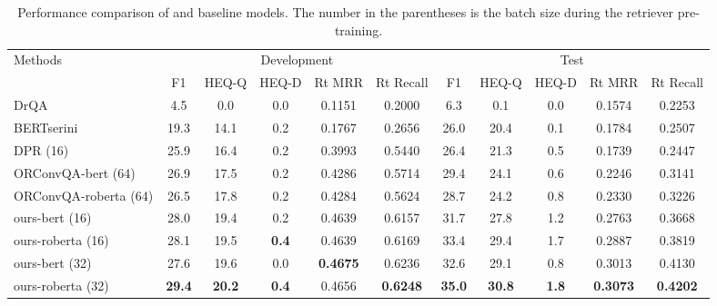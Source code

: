 \renewcommand{\arraystretch}{1.2}
\begin{table*}[t]
  \centering
  \caption{Performance comparison of {\modelname} and baseline models. The number in the parentheses is the batch size during the retriever pre-training.}
  \vspace{-0.1in}
     \begin{tabular}{p{10.5em}cccccccccc}
    \toprule
    \multirow{2}[4]{*}{Methods} & \multicolumn{5}{c}{Development}                       & \multicolumn{5}{c}{Test} \\
\cmidrule(lr){2-6} \cmidrule(lr){7-11}     \multicolumn{1}{c}{} & F1    & HEQ-Q & HEQ-D & Rt MRR & Rt Recall & F1    & HEQ-Q & HEQ-D & Rt MRR  & Rt Recall \\
    \midrule
    DrQA~\cite{chen2017reading}  & 4.5   & 0.0   & 0.0   & 0.1151   & 0.2000  & 6.3   & 0.1   & 0.0   & 0.1574   & 0.2253 \\
    BERTserini~\cite{yang2019end} & 19.3  & 14.1  & 0.2   & 0.1767  & 0.2656  & 26.0  & 20.4  & 0.1   & 0.1784   & 0.2507 \\
    DPR (16)~\cite{karpukhin2020dense} & 25.9  & 16.4  & 0.2   & 0.3993  & 0.5440  & 26.4  & 21.3  & 0.5   & 0.1739  & 0.2447  \\
    \midrule
    ORConvQA-bert (64)~\cite{qu2020open} & 26.9  & 17.5  & 0.2   & 0.4286   & 0.5714  & 29.4  & 24.1  & 0.6   & 0.2246  & 0.3141  \\
    ORConvQA-roberta (64) & 26.5 & 17.8 & 0.2 &	0.4284  & 0.5624 & 	28.7 &	24.2 &	0.8 & 0.2330  & 0.3226 \\
    \midrule
    ours-bert (16)  & 28.0 &	19.4 &	0.2 & 0.4639  & 0.6157 & 31.7 & 27.8 &	1.2 & 0.2763  & 0.3668  \\
    ours-roberta (16) & 28.1 & 19.5 & \textbf{0.4} & 0.4639 & 0.6169 & 33.4 & 29.4 & 1.7 & 0.2887  & 0.3819\\
    ours-bert (32) & 27.6 &	19.6 &	0.0 & \textbf{0.4675}  & 0.6236 & 32.6 & 29.1 & 0.8 & 0.3013  & 0.4130  \\
    ours-roberta (32)& \textbf{29.4}  & \textbf{20.2}  & \textbf{0.4}   & 0.4656   & \textbf{0.6248}  & \textbf{35.0}  & \textbf{30.8}  & \textbf{1.8}   & \textbf{0.3073}  & \textbf{0.4202}  \\
    \bottomrule
    \end{tabular}%
  \label{tab:overall}%
\end{table*}%


